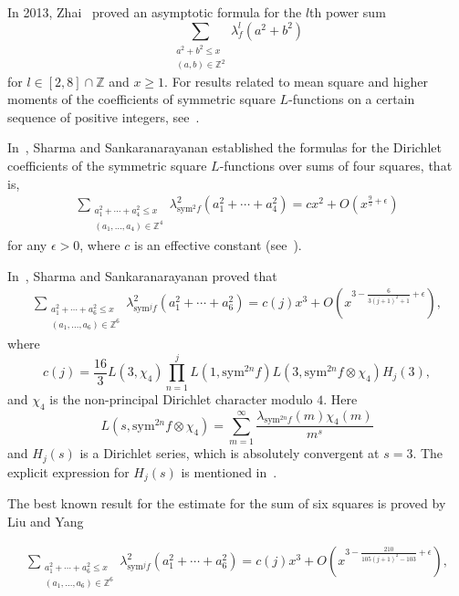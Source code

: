 \documentclass[10pt]{amsart}
\begin{document}
In 2013, Zhai~\cite{Zhai} proved an asymptotic formula for the $l$th
power sum 
\[
\sum_{\substack{a^{2}+b^{2}\leq x \\ (a,b)\in\mathbb{Z}^{2}}}\lambda_{f}^{l}(a^{2}+b^{2})
\]
for $l \in [2,8]\cap \mathbb{Z}$ and $x\geq 1$. For results related to mean square and higher moments of the coefficients of symmetric square $L$-functions on a certain sequence of positive integers, see~\cite{SharmaSankaranarayanan2023B, SharmaSankaranarayanan2022}.

In~\cite{Sharma2022}, Sharma and Sankaranarayanan established the formulas for the Dirichlet coefficients of the symmetric square $L$-functions over sums of four squares, that is,
\begin{align*}
\sum_{\substack{a_{1}^{2}+\cdots+a_{4}^{2}\leq x \\ (a_{1},\ldots,a_{4})\in\mathbb{Z}^{4}}}\lambda^{2}_{\mathrm{sym}^{2}f}(a_{1}^{2}+\cdots+a_{4}^{2}) = cx^2+O(x^{\frac{9}{5}+\epsilon})
\end{align*}
for any $\epsilon > 0$, where $c $ is an effective constant (see~\cite[Theorem~1.1]{Sharma2022}).

In~\cite{SharmaSankaranarayanan2023}, Sharma and Sankaranarayanan proved that 
\begin{align*}
\sum_{\substack{a_{1}^{2}+\cdots+a_{6}^{2}\leq x \\ (a_{1},\ldots,a_{6})\in\mathbb{Z}^{6}}}\lambda^{2}_{\mathrm{sym}^{j}f}(a_{1}^{2}+\cdots+a_{6}^{2}) = c(j)x^3+O(x^{3-\frac{6}{3(j+1)^2+1}+\epsilon}),    
\end{align*}
where $$c(j) = \frac{16}{3}L(3,\chi_4)\prod_{n=1}^{j}L(1,\mathrm{sym}^{2n}f)L(3,\mathrm{sym}^{2n}f \otimes \chi_4)H_j(3),$$ and $\chi_4$ is the non-principal Dirichlet character modulo $4$. 
Here \[L(s,\mathrm{sym}^{2n}f\otimes\chi_{4}) = \sum_{m=1}^{\infty} \frac{\lambda_{\mathrm{sym}^{2n}f}(m)\chi_4(m)}{m^s}\] and $H_j(s)$ is a Dirichlet series, which is absolutely convergent at $s=3$. The explicit expression for $H_j(s)$  is mentioned in~\cite{SharmaSankaranarayanan2023}.

The best known result for the estimate for the sum of six squares is proved by Liu and Yang~\cite{Liu2024}

\begin{align*}
\sum_{\substack{a_{1}^{2}+\cdots+a_{6}^{2}\leq x \\ (a_{1},\ldots,a_{6})\in\mathbb{Z}^{6}}}\lambda^{2}_{\mathrm{sym}^{j}f}(a_{1}^{2}+\cdots+a_{6}^{2}) = c(j)x^3+O(x^{3-\frac{210}{105(j+1)^2-103}+\epsilon}),  
\end{align*}
\end{document}
